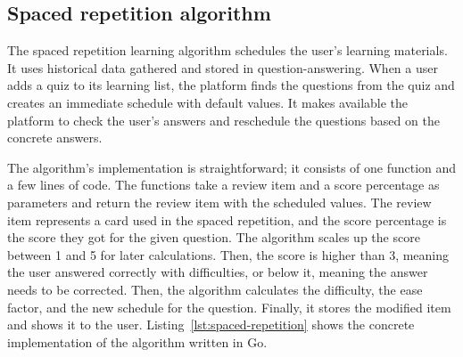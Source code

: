 \subsection{Spaced repetition algorithm}\label{subsec:spaced-repetition-algorithm}

The spaced repetition learning algorithm schedules the user's learning materials. It uses historical data gathered and stored in question-answering. When a user adds a quiz to its learning list, the platform finds the questions from the quiz and creates an immediate schedule with default values. It makes available the platform to check the user's answers and reschedule the questions based on the concrete answers.

The algorithm's implementation is straightforward; it consists of one function and a few lines of code. The functions take a review item and a score percentage as parameters and return the review item with the scheduled values. The review item represents a card used in the spaced repetition, and the score percentage is the score they got for the given question. The algorithm scales up the score between 1 and 5 for later calculations. Then, the score is higher than 3, meaning the user answered correctly with difficulties, or below it, meaning the answer needs to be corrected. Then, the algorithm calculates the difficulty, the ease factor, and the new schedule for the question. Finally, it stores the modified item and shows it to the user. Listing~\ref{lst:spaced-repetition} shows the concrete implementation of the algorithm written in Go.

